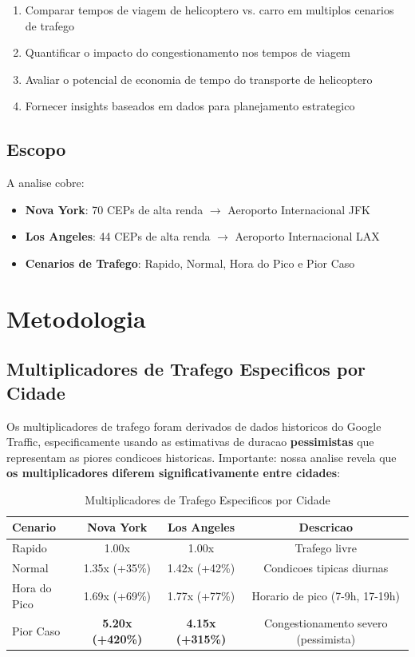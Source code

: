\documentclass[12pt,a4paper]{article}
\begin{document}
\begin{enumerate}
    \item Comparar tempos de viagem de helicoptero vs. carro em multiplos cenarios de trafego
    \item Quantificar o impacto do congestionamento nos tempos de viagem
    \item Avaliar o potencial de economia de tempo do transporte de helicoptero
    \item Fornecer insights baseados em dados para planejamento estrategico
\end{enumerate}

\subsection{Escopo}

A analise cobre:
\begin{itemize}
    \item \textbf{Nova York}: 70 CEPs de alta renda $\rightarrow$ Aeroporto Internacional JFK
    \item \textbf{Los Angeles}: 44 CEPs de alta renda $\rightarrow$ Aeroporto Internacional LAX
    \item \textbf{Cenarios de Trafego}: Rapido, Normal, Hora do Pico e Pior Caso
\end{itemize}

\section{Metodologia}

\subsection{Multiplicadores de Trafego Especificos por Cidade}

Os multiplicadores de trafego foram derivados de dados historicos do Google Traffic, especificamente usando as estimativas de duracao \textbf{pessimistas} que representam as piores condicoes historicas. Importante: nossa analise revela que \textbf{os multiplicadores diferem significativamente entre cidades}:

\begin{table}[H]
\centering
\caption{Multiplicadores de Trafego Especificos por Cidade}
\begin{tabular}{lccc}
\toprule
\textbf{Cenario} & \textbf{Nova York} & \textbf{Los Angeles} & \textbf{Descricao} \\
\midrule
Rapido & 1.00x & 1.00x & Trafego livre \\
Normal & 1.35x (+35\%) & 1.42x (+42\%) & Condicoes tipicas diurnas \\
Hora do Pico & 1.69x (+69\%) & 1.77x (+77\%) & Horario de pico (7-9h, 17-19h) \\
\rowcolor{lared!20} Pior Caso & \textbf{5.20x (+420\%)} & \textbf{4.15x (+315\%)} & Congestionamento severo (pessimista) \\
\bottomrule
\end{tabular}
\end{table}
\end{document}
